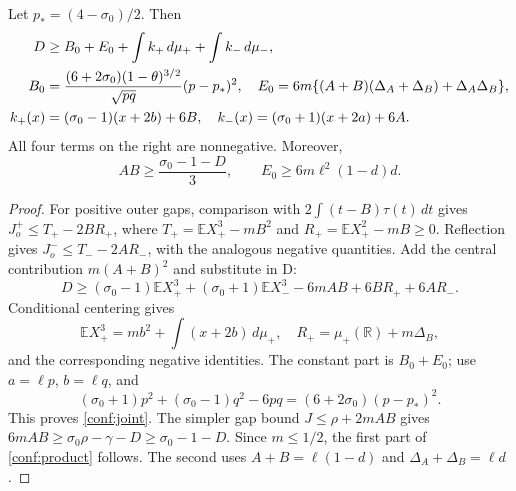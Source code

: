 \documentclass[11pt]{article}
\newcommand{\E}{\mathbb E}\newcommand{\Pp}{\mathbb P}
\begin{document}
\begin{lemma}\label{conf:cost}
Let $p_*=(4-\sigma_0)/2$. Then
\begin{align}
 D&\ge B_0+E_0+\int k_+\,d\mu_++\int k_-\,d\mu_-,\label{conf:joint}\\
 B_0&=\frac{(6+2\sigma_0)(1-\theta)^{3/2}}{\sqrt{pq}}(p-p_*)^2,
 \quad E_0=6m\{(A+B)(\Delta_A+\Delta_B)+\Delta_A\Delta_B\},\notag\\
 k_+(x)&=(\sigma_0-1)(x+2b)+6B,
 \quad k_-(x)=(\sigma_0+1)(x+2a)+6A.\notag
\end{align}
All four terms on the right are nonnegative. Moreover,
\begin{equation}\label{conf:product}
 AB\ge\frac{\sigma_0-1-D}{3},\qquad
 E_0\ge6m\ell^2(1-d)d.
\end{equation}
\end{lemma}
\begin{proof}
For positive outer gaps, comparison with
$2\int(t-B)\tau(t)\,dt$ gives
$J_o^+\le T_+-2BR_+$, where
$T_+=\E X_+^3-mB^2$ and $R_+=\E X_+^2-mB\ge0$.
Reflection gives $J_o^-\le T_--2AR_-$, with the analogous negative
quantities. Add the central contribution $m(A+B)^2$ and substitute in D:
\[
 D\ge(\sigma_0-1)\E X_+^3+(\sigma_0+1)\E X_-^3
            -6mAB+6BR_++6AR_-.
\]
Conditional centering gives
\[
 \E X_+^3=mb^2+\int(x+2b)\,d\mu_+,
 \quad R_+=\mu_+(\mathbb R)+m\Delta_B,
\]
and the corresponding negative identities. The constant part is $B_0+E_0$;
use $a=\ell p$, $b=\ell q$, and
\[
 (\sigma_0+1)p^2+(\sigma_0-1)q^2-6pq
                  =(6+2\sigma_0)(p-p_*)^2.
\]
This proves \eqref{conf:joint}. The simpler gap bound
$J\le\rho+2mAB$ gives
$6mAB\ge\sigma_0\rho-\gamma-D\ge\sigma_0-1-D$.
Since $m\le1/2$, the first part of \eqref{conf:product} follows.
The second uses $A+B=\ell(1-d)$ and
$\Delta_A+\Delta_B=\ell d$.
\end{proof}
\end{document}
